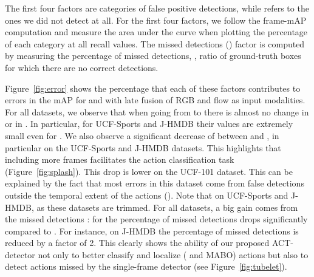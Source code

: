 \documentclass[10pt,twocolumn,letterpaper]{article}
\begin{document}
The first four factors are categories of false positive detections, while  refers to the ones we did not detect at all. For the first four factors, we follow the frame-mAP computation and measure the area under the curve when plotting the percentage of each category at all recall values. The missed detections () factor is computed by measuring the percentage of missed detections, \ie, ratio of ground-truth boxes for which there are no correct detections.

Figure~\ref{fig:error} shows the percentage that each of these factors contributes to errors in the mAP for  and  with late fusion of RGB and flow as input modalities. For all datasets, we observe that when going from  to  there is almost no change in  or in . In particular, for UCF-Sports and J-HMDB their values are extremely small even for . We also observe a significant decrease of  between  and , in particular on the UCF-Sports and J-HMDB datasets. This highlights that including more frames facilitates the action classification task (Figure~\ref{fig:splash}). This drop is lower on the UCF-101 dataset. This can be explained by the fact that most errors in this dataset come from false detections outside the temporal extent of the actions (). Note that  on UCF-Sports and J-HMDB, as these datasets are trimmed. For all datasets, a big gain comes from the missed detections : for  the percentage of missed detections drops significantly compared to . For instance, on J-HMDB the percentage of missed detections is reduced by a factor of 2. This clearly shows the ability of our proposed ACT-detector not only to better classify and localize ( and MABO) actions but also to detect actions missed by the single-frame detector (see Figure~\ref{fig:tubelet}).
       
\begin{table}[t]
\centering
{}
\vspace{0.3mm}
\caption{Comparison of frame-mAP to the state of the art. For~\cite{Peng16eccv}, we report the results with and without their multi-region (+MR).}
\label{table:sotaframeAP}
\vspace{-6mm}
\end{table}       
\end{document}
